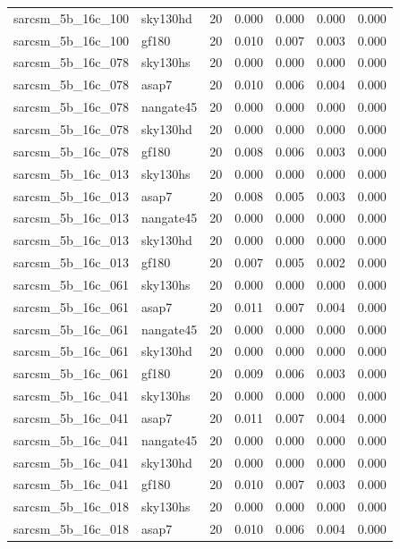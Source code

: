 \begin{tabular}{llrrrrr}
sarcsm\_5b\_16c\_100 & sky130hd & 20 & 0.000 & 0.000 & 0.000 & 0.000 \\
sarcsm\_5b\_16c\_100 & gf180 & 20 & 0.010 & 0.007 & 0.003 & 0.000 \\
sarcsm\_5b\_16c\_078 & sky130hs & 20 & 0.000 & 0.000 & 0.000 & 0.000 \\
sarcsm\_5b\_16c\_078 & asap7 & 20 & 0.010 & 0.006 & 0.004 & 0.000 \\
sarcsm\_5b\_16c\_078 & nangate45 & 20 & 0.000 & 0.000 & 0.000 & 0.000 \\
sarcsm\_5b\_16c\_078 & sky130hd & 20 & 0.000 & 0.000 & 0.000 & 0.000 \\
sarcsm\_5b\_16c\_078 & gf180 & 20 & 0.008 & 0.006 & 0.003 & 0.000 \\
sarcsm\_5b\_16c\_013 & sky130hs & 20 & 0.000 & 0.000 & 0.000 & 0.000 \\
sarcsm\_5b\_16c\_013 & asap7 & 20 & 0.008 & 0.005 & 0.003 & 0.000 \\
sarcsm\_5b\_16c\_013 & nangate45 & 20 & 0.000 & 0.000 & 0.000 & 0.000 \\
sarcsm\_5b\_16c\_013 & sky130hd & 20 & 0.000 & 0.000 & 0.000 & 0.000 \\
sarcsm\_5b\_16c\_013 & gf180 & 20 & 0.007 & 0.005 & 0.002 & 0.000 \\
sarcsm\_5b\_16c\_061 & sky130hs & 20 & 0.000 & 0.000 & 0.000 & 0.000 \\
sarcsm\_5b\_16c\_061 & asap7 & 20 & 0.011 & 0.007 & 0.004 & 0.000 \\
sarcsm\_5b\_16c\_061 & nangate45 & 20 & 0.000 & 0.000 & 0.000 & 0.000 \\
sarcsm\_5b\_16c\_061 & sky130hd & 20 & 0.000 & 0.000 & 0.000 & 0.000 \\
sarcsm\_5b\_16c\_061 & gf180 & 20 & 0.009 & 0.006 & 0.003 & 0.000 \\
sarcsm\_5b\_16c\_041 & sky130hs & 20 & 0.000 & 0.000 & 0.000 & 0.000 \\
sarcsm\_5b\_16c\_041 & asap7 & 20 & 0.011 & 0.007 & 0.004 & 0.000 \\
sarcsm\_5b\_16c\_041 & nangate45 & 20 & 0.000 & 0.000 & 0.000 & 0.000 \\
sarcsm\_5b\_16c\_041 & sky130hd & 20 & 0.000 & 0.000 & 0.000 & 0.000 \\
sarcsm\_5b\_16c\_041 & gf180 & 20 & 0.010 & 0.007 & 0.003 & 0.000 \\
sarcsm\_5b\_16c\_018 & sky130hs & 20 & 0.000 & 0.000 & 0.000 & 0.000 \\
sarcsm\_5b\_16c\_018 & asap7 & 20 & 0.010 & 0.006 & 0.004 & 0.000 \\

\end{tabular}
